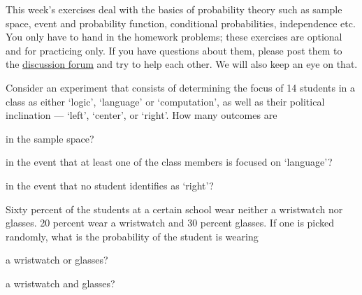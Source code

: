\documentclass[a4paper,10pt,landscape,twocolumn]{scrartcl}
\begin{document}
\practiceproblems

{\sffamily\noindent
  This week's exercises deal with the basics of probability theory such as
  sample space, event and probability function, conditional probabilities,
  independence etc. You only have to hand in the homework problems; these
  exercises are optional and for practicing only. If you have questions about
  them, please post them to the \href{\discussionForumURL}{discussion forum}
  and try to help each other. We will also keep an eye on that.
}


\begin{exercise}[]
  Consider an experiment that consists of determining the focus of 14 students
  in a class as either `logic', `language' or `computation', as well as their
  political inclination --- `left', `center', or `right'. How many outcomes are
  
  \begin{subex}
    in the sample space?
  \end{subex}
  
  \begin{subex}
    in the event that at least one of the class members is focused on
    `language'?
  \end{subex}
  
  \begin{subex}
    in the event that no student identifies as `right'?
  \end{subex}
\end{exercise}


\begin{exercise}[]
  Sixty percent of the students at a certain school wear neither a wristwatch
  nor glasses. 20 percent wear a wristwatch and 30 percent glasses. If one is
  picked randomly, what is the probability of the student is wearing

  \begin{subex}
    a wristwatch or glasses?
  \end{subex}
  
  \begin{subex}
    a wristwatch and glasses?
  \end{subex}		
\end{exercise}

\end{document}
